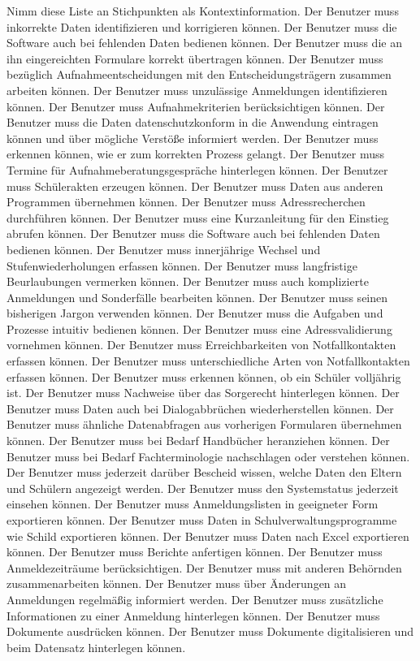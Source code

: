 Nimm diese Liste an Stichpunkten als Kontextinformation.
Der Benutzer muss inkorrekte Daten identifizieren und korrigieren können.
Der Benutzer muss die Software auch bei fehlenden Daten bedienen können. 
Der Benutzer muss die an ihn eingereichten Formulare korrekt übertragen können.
Der Benutzer muss bezüglich Aufnahmeentscheidungen mit den Entscheidungsträgern zusammen arbeiten können.
Der Benutzer muss unzulässige Anmeldungen identifizieren können.
Der Benutzer muss Aufnahmekriterien berücksichtigen können.
Der Benutzer muss die Daten datenschutzkonform in die Anwendung eintragen können und über mögliche Verstöße informiert werden.
Der Benutzer muss erkennen können, wie er zum korrekten Prozess gelangt.
Der Benutzer muss Termine für Aufnahmeberatungsgespräche hinterlegen können.
Der Benutzer muss Schülerakten erzeugen können.
Der Benutzer muss Daten aus anderen Programmen übernehmen können.
Der Benutzer muss Adressrecherchen durchführen können.
Der Benutzer muss eine Kurzanleitung für den Einstieg abrufen können.
Der Benutzer muss die Software auch bei fehlenden Daten bedienen können.
Der Benutzer muss innerjährige Wechsel und Stufenwiederholungen erfassen können.
Der Benutzer muss langfristige Beurlaubungen vermerken können.
Der Benutzer muss auch komplizierte Anmeldungen und Sonderfälle bearbeiten können.
Der Benutzer muss seinen bisherigen Jargon verwenden können.
Der Benutzer muss die Aufgaben und Prozesse intuitiv bedienen können.
Der Benutzer muss eine Adressvalidierung vornehmen können.
Der Benutzer muss Erreichbarkeiten von Notfallkontakten erfassen können.
Der Benutzer muss unterschiedliche Arten von Notfallkontakten erfassen können.
Der Benutzer muss erkennen können, ob ein Schüler volljährig ist.
Der Benutzer muss Nachweise über das Sorgerecht hinterlegen können.
Der Benutzer muss Daten auch bei Dialogabbrüchen wiederherstellen können.
Der Benutzer muss ähnliche Datenabfragen aus vorherigen Formularen übernehmen können.
Der Benutzer muss bei Bedarf Handbücher heranziehen können.
Der Benutzer muss bei Bedarf Fachterminologie nachschlagen oder verstehen können.
Der Benutzer muss jederzeit darüber Bescheid wissen, welche Daten den Eltern und Schülern angezeigt werden.
Der Benutzer muss den Systemstatus jederzeit einsehen können.
Der Benutzer muss Anmeldungslisten in geeigneter Form exportieren können.
Der Benutzer muss Daten in Schulverwaltungsprogramme wie Schild exportieren können.
Der Benutzer muss Daten nach Excel exportieren können.
Der Benutzer muss Berichte anfertigen können.
Der Benutzer muss Anmeldezeiträume berücksichtigen.
Der Benutzer muss mit anderen Behörnden zusammenarbeiten können.
Der Benutzer muss über Änderungen an Anmeldungen regelmäßig informiert werden.
Der Benutzer muss zusätzliche Informationen zu einer Anmeldung hinterlegen können.
Der Benutzer muss Dokumente ausdrücken können.
Der Benutzer muss Dokumente digitalisieren und beim Datensatz hinterlegen können.

